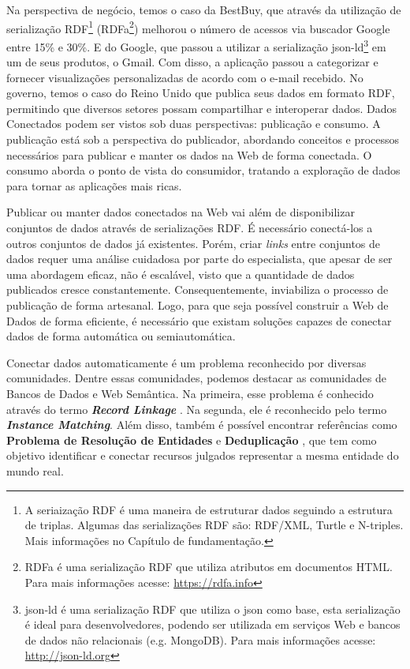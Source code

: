 Na perspectiva de negócio, temos o caso da BestBuy, que através da utilização de serialização RDF\footnote{A seriaização RDF é uma maneira de estruturar dados seguindo a estrutura de triplas. Algumas das serializações RDF são: RDF/XML, Turtle e N-triples. Mais informações no Capítulo de fundamentação.} (RDFa\footnote{RDFa é uma serialização RDF que utiliza atributos em documentos HTML. Para mais informações acesse: \url{https://rdfa.info}}) melhorou o número de acessos via buscador  Google entre 15\% e 30\%. E do Google, que passou a utilizar a serialização json-ld\footnote{json-ld é uma serialização RDF que utiliza o json como base, esta serialização é ideal para desenvolvedores, podendo ser utilizada em serviços Web e bancos de dados não relacionais (e.g. MongoDB). Para mais informações acesse: \url{http://json-ld.org}} em um de seus produtos, o Gmail. Com disso, a aplicação passou a categorizar e fornecer visualizações personalizadas de acordo com o e-mail recebido. No governo, temos o caso do Reino Unido que publica seus dados em formato RDF, permitindo que diversos setores possam compartilhar e interoperar dados.
Dados Conectados podem ser vistos sob duas perspectivas: publicação e consumo. A publicação está sob a perspectiva do publicador, abordando conceitos \cite{berners2006linked, wood2014linked} e processos \cite{bizer2007publish, hyland2011joy, villazon2011methodological, Avila2015} necessários para publicar e manter os dados na Web de forma conectada. O consumo aborda o ponto de vista do consumidor, tratando a exploração de dados para tornar as aplicações mais ricas. 

Publicar ou manter dados conectados na Web vai além de disponibilizar conjuntos de dados através de serializações RDF. É necessário conectá-los a outros conjuntos de dados já existentes. Porém, criar \textit{links} entre conjuntos de dados requer uma análise cuidadosa por parte do especialista, que apesar de ser uma abordagem eficaz, não é escalável, visto que a quantidade de dados publicados cresce constantemente. Consequentemente, inviabiliza o processo de publicação de forma artesanal. Logo, para que seja possível construir a Web de Dados de forma eficiente, é necessário que existam soluções capazes de conectar dados de forma automática ou semiautomática.

Conectar dados automaticamente é um problema reconhecido por diversas comunidades. Dentre essas comunidades, podemos destacar as comunidades de Bancos de Dados e Web Semântica. Na primeira, esse problema é conhecido através do termo \textbf{\textit{Record Linkage}} \cite{gu2003record}. Na segunda, ele é reconhecido pelo termo \textbf{\textit{Instance Matching}}. Além disso, também é possível encontrar referências como \textbf{Problema de Resolução de Entidades} \cite{menestrina2005generic} e \textbf{Deduplicação} \cite{sarawagi2002interactive}, que tem como objetivo identificar e conectar recursos julgados representar a mesma entidade do mundo real.

